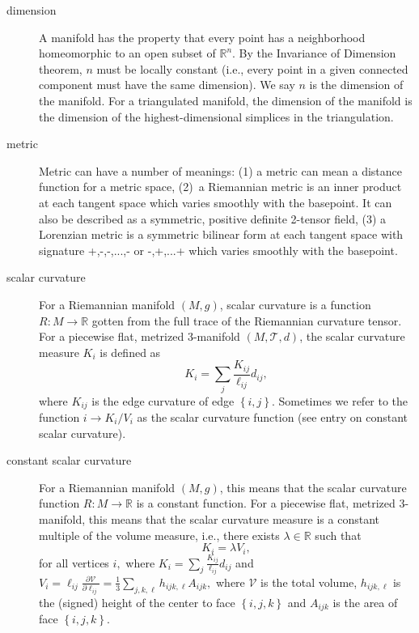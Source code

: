 \begin{description}
\item[dimension] A manifold has the property that every point has a
neighborhood homeomorphic to an open subset of $\mathbb{R}^{n}.$ By the
Invariance of Dimension theorem, $n$ must be locally constant (i.e., every
point in a given connected component must have the same dimension). We say $%
n $ is the dimension of the manifold. For a triangulated manifold, the
dimension of the manifold is the dimension of the highest-dimensional
simplices in the triangulation.

\item[metric] Metric can have a number of meanings: (1) a metric can mean a
distance function for a metric space, (2)\ a Riemannian metric is an inner
product at each tangent space which varies smoothly with the basepoint. It
can also be described as a symmetric, positive definite 2-tensor field, (3)
a Lorenzian metric is a symmetric bilinear form at each tangent space with
signature +,-,-,...,- or -,+,...+ which varies smoothly with the basepoint.

\item[scalar curvature] For a Riemannian manifold $\left( M,g\right) $,
scalar curvature is a function $R:M\rightarrow \mathbb{R}$ gotten from the
full trace of the Riemannian curvature tensor. For a piecewise flat,
metrized 3-manifold $\left( M,\mathcal{T},d\right) $, the scalar curvature
measure $K_{i}$ is defined as 
\[
K_{i}=\sum_{j}\frac{K_{ij}}{\ell _{ij}}d_{ij}, 
\]%
where $K_{ij}$ is the edge curvature of edge $\left\{ i,j\right\} .$
Sometimes we refer to the function $i\rightarrow K_{i}/V_{i}$ as the scalar
curvature function (see entry on constant scalar curvature).

\item[constant scalar curvature] For a Riemannian manifold $\left(
M,g\right) $, this means that the scalar curvature function $R:M\rightarrow 
\mathbb{R}$ is a constant function. For a piecewise flat, metrized
3-manifold, this means that the scalar curvature measure is a constant
multiple of the volume measure, i.e., there exists $\lambda \in \mathbb{R}$
such that 
\[
K_{i}=\lambda V_{i}, 
\]%
for all vertices $i,$ where $K_{i}=\sum_{j}\frac{K_{ij}}{\ell _{ij}}d_{ij}$
and $V_{i}=\ell _{ij}\frac{\partial \mathcal{V}}{\partial \ell _{ij}}=\frac{1%
}{3}\sum_{j,k,\ell }h_{ijk,\ell }A_{ijk},$ where $\mathcal{V}$ is the total
volume, $h_{ijk,\ell }$ is the (signed) height of the center to face $%
\left\{ i,j,k\right\} $ and $A_{ijk}$ is the area of face $\left\{
i,j,k\right\} .$


\end{description}
